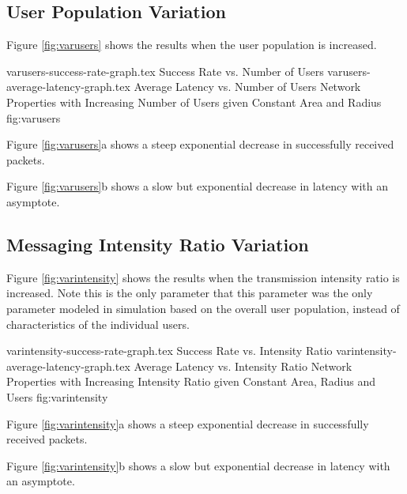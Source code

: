 \subsection{User Population Variation}
Figure \ref{fig:varusers} shows the results when the user population is increased.

\sidebysidefigures
{varusers-success-rate-graph.tex}      {Success Rate vs. Number of Users}
{varusers-average-latency-graph.tex}   {Average Latency vs. Number of Users}
{Network Properties with Increasing Number of Users given Constant Area and Radius}
{fig:varusers}

Figure \ref{fig:varusers}a shows a steep exponential decrease in successfully received packets.

Figure \ref{fig:varusers}b shows a slow but exponential decrease in latency with an asymptote.

\subsection{Messaging Intensity Ratio Variation}
Figure \ref{fig:varintensity} shows the results when the transmission intensity ratio is increased.
Note this is the only parameter that this parameter was the only parameter modeled in simulation
based on the overall user population, instead of characteristics of the individual users.

\sidebysidefigures
{varintensity-success-rate-graph.tex}      {Success Rate vs. Intensity Ratio}
{varintensity-average-latency-graph.tex}   {Average Latency vs. Intensity Ratio}
{Network Properties with Increasing Intensity Ratio given Constant Area, Radius and Users}
{fig:varintensity}

Figure \ref{fig:varintensity}a shows a steep exponential decrease in successfully received packets.

Figure \ref{fig:varintensity}b shows a slow but exponential decrease in latency with an asymptote.
